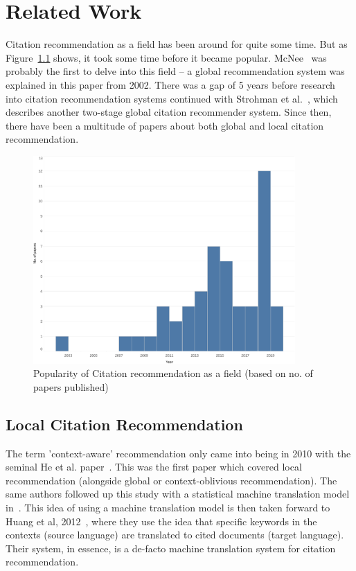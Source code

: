 \chapter{Related Work}\label{chap:relatedwork}
Citation recommendation as a field has been around for quite some time. But as Figure~\ref{fig:citationyears} shows, it took some time before it became popular. McNee~\cite{McNeeACGLRKR02} was probably the first to delve into this field -- a global recommendation system was explained in this paper from 2002. There was a gap of 5 years before research into citation recommendation systems continued with Strohman et al.~\cite{StrohmanCJ07}, which describes another two-stage global citation recommender system. Since then, there have been a multitude of papers about both global and local citation recommendation.
\begin{figure}[h]
    \centering
    \includegraphics[width=10cm]{figures/yearcitations.pdf}
    \caption{Popularity of Citation recommendation as a field (based on no. of papers published)}
    \label{fig:citationyears}
\end{figure}
\section{Local Citation Recommendation}
The term 'context-aware' recommendation only came into being in 2010 with the seminal He et al. paper~\cite{He2010}. This was the first paper which covered local recommendation (alongside global or context-oblivious recommendation). The same authors followed up this study with a statistical machine translation model in~\cite{He2011}. This idea of using a machine translation model is then taken forward to Huang et al, 2012~\cite{HuangKCMGR12}, where they use the idea that specific keywords in the contexts (source language) are translated to cited documents (target language). Their system, in essence, is a de-facto machine translation system for citation recommendation. 
